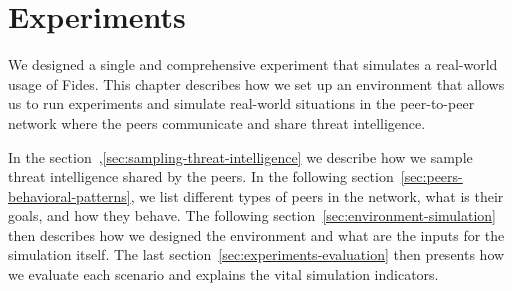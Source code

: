 \chapter{Experiments}
\label{ch:experiments}
We designed a single and comprehensive experiment that simulates a real-world usage of Fides. This chapter describes how we set up an environment that allows us to run experiments and simulate real-world situations in the peer-to-peer network where the peers communicate and share threat intelligence.

In the section~,\ref{sec:sampling-threat-intelligence} we describe how we sample threat intelligence shared by the peers.
In the following section~\ref{sec:peers-behavioral-patterns}, we list different types of peers in the network, what is their goals, and how they behave.
The following section~\ref{sec:environment-simulation} then describes how we designed the environment and what are the inputs for the simulation itself.
The last section~\ref{sec:experiments-evaluation} then presents how we evaluate each scenario and explains the vital simulation indicators.







